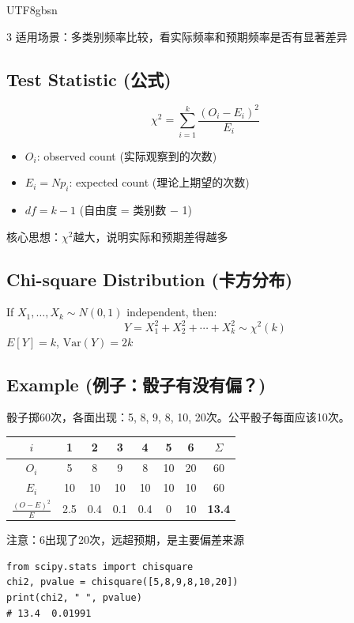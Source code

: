 \documentclass[10pt,landscape,a4paper]{article}
\newcommand{\zhint}[1]{{\scriptsize\color{gray!70!black}#1}}
\begin{document}
\begin{CJK}{UTF8}{gbsn}
\begin{multicols}{3}
\zhint{适用场景：多类别频率比较，看实际频率和预期频率是否有显著差异}

\subsection{Test Statistic \zhint{(公式)}}
\[
\chi^2 = \sum_{i=1}^{k} \frac{(O_i - E_i)^2}{E_i}
\]
\begin{itemize}[leftmargin=*, nosep, itemsep=0pt]
    \item $O_i$: observed count \zhint{(实际观察到的次数)}
    \item $E_i = N p_i$: expected count \zhint{(理论上期望的次数)}
    \item $df = k - 1$ \zhint{(自由度 = 类别数 $-$ 1)}
\end{itemize}
\zhint{核心思想：$\chi^2$越大，说明实际和预期差得越多}

\subsection{Chi-square Distribution \zhint{(卡方分布)}}
If $X_1, \ldots, X_k \sim N(0,1)$ independent, then:
\[
Y = X_1^2 + X_2^2 + \cdots + X_k^2 \sim \chi^2(k)
\]
$E[Y]=k$, \; $\mathrm{Var}(Y)=2k$

\subsection{Example \zhint{(例子：骰子有没有偏？)}}
\zhint{骰子掷60次，各面出现：5, 8, 9, 8, 10, 20次。公平骰子每面应该10次。}

\begin{center}
\small
\begin{tabular}{c|cccccc|c}
\toprule
$i$ & 1 & 2 & 3 & 4 & 5 & 6 & $\Sigma$ \\
\midrule
$O_i$ & 5 & 8 & 9 & 8 & 10 & 20 & 60 \\
$E_i$ & 10 & 10 & 10 & 10 & 10 & 10 & 60 \\
$\frac{(O-E)^2}{E}$ & 2.5 & 0.4 & 0.1 & 0.4 & 0 & 10 & \textbf{13.4} \\
\bottomrule
\end{tabular}
\end{center}
\zhint{注意：6出现了20次，远超预期，是主要偏差来源}

\begin{lstlisting}
from scipy.stats import chisquare
chi2, pvalue = chisquare([5,8,9,8,10,20])
print(chi2, " ", pvalue)
# 13.4  0.01991
\end{lstlisting}


\end{multicols}
\end{CJK}
\end{document}
